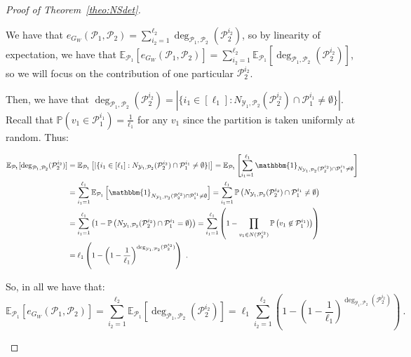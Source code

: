 \begin{proof}[Proof of Theorem~\ref{theo:NSdet}]
\begin{enumerate}
We have that $e_{G_W}(\mathcal{P}_1,\mathcal{P}_2) = \sum_{i_2=1}^{\ell_2}\deg_{\mathcal{P}_1,\mathcal{P}_2}(\mathcal{P}_2^{i_2})$, so by linearity of expectation, we have that $\mathbb{E}_{\mathcal{P}_1}[e_{G_W}(\mathcal{P}_1,\mathcal{P}_2)] = \sum_{i_2=1}^{\ell_2}\mathbb{E}_{\mathcal{P}_1}[\deg_{\mathcal{P}_1,\mathcal{P}_2}(\mathcal{P}_2^{i_2})]$, so we will focus on the contribution of one particular $\mathcal{P}_2^{i_2}$.

Then, we have that $\deg_{\mathcal{P}_1,\mathcal{P}_2}(\mathcal{P}_2^{i_2})=|\{i_1 \in [\ell_1]: N_{\mathcal{Y}_1,\mathcal{P}_2}(\mathcal{P}_2^{i_2}) \cap \mathcal{P}_1^{i_1} \not= \emptyset  \}|$. Recall that $\mathbb{P}\left(v_1 \in \mathcal{P}_1^{i_1}\right) = \frac{1}{\ell_1}$ for any $v_1$ since the partition is taken uniformly at random. Thus:

\begin{equation}
  \begin{aligned}
    \mathbb{E}_{\mathcal{P}_1}[\deg_{\mathcal{P}_1,\mathcal{P}_2}(\mathcal{P}_2^{i_2})] &= \mathbb{E}_{\mathcal{P}_1}\left[|\{i_1 \in [\ell_1]: N_{\mathcal{Y}_1,\mathcal{P}_2}(\mathcal{P}_2^{i_2}) \cap \mathcal{P}_1^{i_1} \not= \emptyset  \}|\right]
    = \mathbb{E}_{\mathcal{P}_1}\left[\sum_{i_1=1}^{\ell_1} \mathbbm{1}_{N_{\mathcal{Y}_1,\mathcal{P}_2}(\mathcal{P}_2^{i_2}) \cap \mathcal{P}_1^{i_1} \not= \emptyset}\right]\\
    &= \sum_{i_1 = 1}^{\ell_1} \mathbb{E}_{\mathcal{P}_1}\left[\mathbbm{1}_{N_{\mathcal{Y}_1,\mathcal{P}_2}(\mathcal{P}_2^{i_2}) \cap \mathcal{P}_1^{i_1} \not= \emptyset}\right]
    = \sum_{i_1 = 1}^{\ell_1}\mathbb{P}\left(N_{\mathcal{Y}_1,\mathcal{P}_2}(\mathcal{P}_2^{i_2}) \cap \mathcal{P}_1^{i_1} \not= \emptyset\right)\\
    &= \sum_{i_1 = 1}^{\ell_1}\left(1 - \mathbb{P}\left(N_{\mathcal{Y}_1,\mathcal{P}_2}(\mathcal{P}_2^{i_2}) \cap \mathcal{P}_1^{i_1} = \emptyset\right)\right)
    = \sum_{i_1 = 1}^{\ell_1}\left(1 - \prod_{v_1 \in N(\mathcal{P}_2^{i_2})}\mathbb{P}\left(v_1 \not\in \mathcal{P}_1^{i_1})\right)\right)\\
    &= \ell_1\left(1-\left(1-\frac{1}{\ell_1}\right)^{\deg_{\mathcal{Y}_1,\mathcal{P}_2}(\mathcal{P}_2^{i_2})}\right) \ .
  \end{aligned}
\end{equation}

So, in all we have that:
\[ \mathbb{E}_{\mathcal{P}_1}[e_{G_W}(\mathcal{P}_1,\mathcal{P}_2)] = \sum_{i_2=1}^{\ell_2}\mathbb{E}_{\mathcal{P}_1}[\deg_{\mathcal{P}_1,\mathcal{P}_2}(\mathcal{P}_2^{i_2})] = \ell_1\sum_{i_2=1}^{\ell_2}\left(1-\left(1-\frac{1}{\ell_1}\right)^{\deg_{\mathcal{Y}_1,\mathcal{P}_2}(\mathcal{P}_2^{i_2})}\right) \ . \]


\end{enumerate}
\end{proof}
